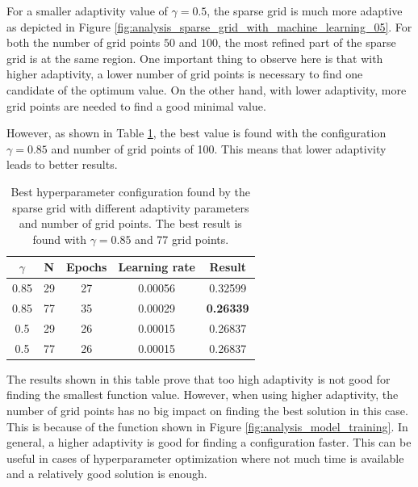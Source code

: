 For a smaller adaptivity value of $ \gamma = 0.5 $, the sparse grid is much more adaptive as depicted in Figure \ref{fig:analysis_sparse_grid_with_machine_learning_05}. For both the number of grid points $ 50 $ and $ 100 $, the most refined part of the sparse grid is at the same region. One important thing to observe here is that with higher adaptivity, a lower number of grid points is necessary to find one candidate of the optimum value. On the other hand, with lower adaptivity, more grid points are needed to find a good minimal value. 

However, as shown in Table \ref{tab:analysis_sparse_grid_with_machine_learning_results}, the best value is found with the configuration $ \gamma = 0.85 $ and number of grid points of 100. This means that lower adaptivity leads to better results.

\begin{table}[H]
	\centering
	\caption{ Best hyperparameter configuration found by the sparse grid with different adaptivity parameters and number of grid points. The best result is found with $ \gamma = 0.85 $ and 77 grid points. }
	\label{tab:analysis_sparse_grid_with_machine_learning_results}
	\begin{tabular}{| c c | c c | c |} 
		\hline
		$ \gamma $ & N &  Epochs & Learning rate & Result \\
		\hline
		0.85 & 29 & 27 & 0.00056 & 0.32599 \\
		0.85 & 77 & 35 & 0.00029 & \textbf{0.26339} \\
		0.5 & 29 & 26 & 0.00015 & 0.26837 \\
		0.5 & 77 & 26 & 0.00015 & 0.26837 \\
		\hline
	\end{tabular}
\end{table}

The results shown in this table prove that too high adaptivity is not good for finding the smallest function value. However, when using higher adaptivity, the number of grid points has no big impact on finding the best solution in this case. This is because of the function shown in Figure \ref{fig:analysis_model_training}. In general, a higher adaptivity is good for finding a configuration faster. This can be useful in cases of hyperparameter optimization where not much time is available and a relatively good solution is enough. 

